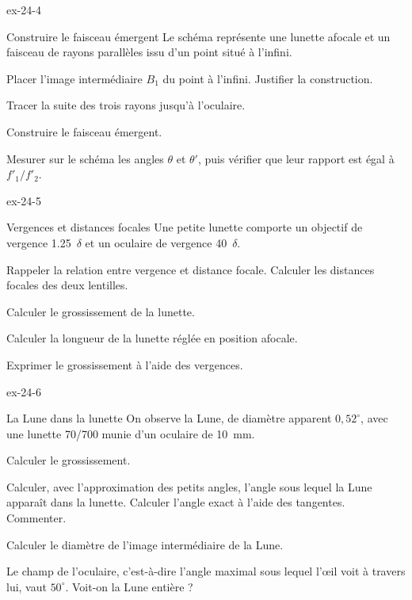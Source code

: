 \begin{blocLivre}{ex-24-4}
\begin{exercice}[1]{Construire le faisceau émergent}
Le schéma représente une lunette afocale et un faisceau de rayons parallèles issu d'un point situé à l'infini.
\begin{questions}
\item Placer l'image intermédiaire $B_1$ du point à l'infini. Justifier la construction.
\item Tracer la suite des trois rayons jusqu'à l'oculaire.
\item Construire le faisceau émergent.
\item Mesurer sur le schéma les angles $\theta$ et $\theta'$, puis vérifier que leur rapport est égal à $f'_1/f'_2$.
\end{questions}
\end{exercice}
\end{blocLivre}
\begin{blocLivre}{ex-24-5}
\begin{exercice}[1]{Vergences et distances focales}
Une petite lunette comporte un objectif de vergence \num{+1,25}~$\delta$ et un oculaire de vergence \num{+40}~$\delta$.
\begin{questions}
\item Rappeler la relation entre vergence et distance focale. Calculer les distances focales des deux lentilles.
\item Calculer le grossissement de la lunette.
\item Calculer la longueur de la lunette réglée en position afocale.
\item Exprimer le grossissement à l'aide des vergences.
\end{questions}
\end{exercice}
\end{blocLivre}
\begin{blocLivre}{ex-24-6}
\begin{exercice}[2]{La Lune dans la lunette}
On observe la Lune, de diamètre apparent $0{,}52^\circ$, avec une lunette 70/700 munie d'un oculaire de \qty{10}{mm}.
\begin{questions}
\item Calculer le grossissement.
\item Calculer, avec l'approximation des petits angles, l'angle sous lequel la Lune apparaît dans la lunette. Calculer
l'angle exact à l'aide des tangentes. Commenter.
\item Calculer le diamètre de l'image intermédiaire de la Lune.
\item Le champ de l'oculaire, c'est-à-dire l'angle maximal sous lequel l'œil voit à travers lui, vaut $50^\circ$. Voit-on la
Lune entière ?
\end{questions}
\end{exercice}
\end{blocLivre}
